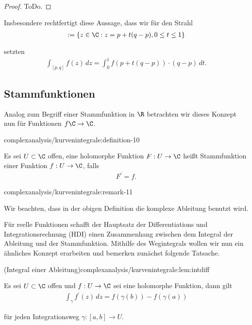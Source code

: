 \documentclass[letterpaper,10pt,german]{jupyterBook}
\begin{document}
\begin{proof}
 ToDo.
\end{proof}

\par
Insbesondere rechtfertigt diese Aussage, dass wir für den Strahl
\begin{align*}
[p,q]:=\{z\in\C: z = p+t(q-p), 0\leq t\leq 1\}
\end{align*}
\par
setzten
\begin{align*}
\int_{[p,q]} f(z)\, dz = \int_0^1 f(p+t(q-p))\cdot (q-p)\, dt.
\end{align*}

\subsection{Stammfunktionen}
\label{\detokenize{complexanalysis/kurvenintegrale:stammfunktionen}}
\par
Analog zum Begriff einer Stammfunktion in \(\R\) betrachten wir dieses Konzept nun für Funktionen \(f\C\to\C\).
\begin{definition}{}{complexanalysis/kurvenintegrale:definition-10}



\par
Es sei \(U\subset\C\) offen, eine holomorphe Funktion \(F:U\to\C\) heißt Stammfunktion einer Funktion \(f:U\to\C\), falls
\begin{align*}
F^\prime = f.
\end{align*}\end{definition}
\begin{remark}{}{complexanalysis/kurvenintegrale:remark-11}



\par
Wir beachten, dass in der obigen Definition die komplexe Ableitung benutzt wird.
\end{remark}

\par
Für reelle Funktionen schafft der Hauptsatz der Differentiations  und Integrationsrechnung (HDI) einen Zusammenhang zwischen dem Integral der Ableitung und der Stammfunktion. Mithilfe des Wegintegrals wollen wir nun ein ähnliches Konzept erarbeiten und bemerken zunächst folgende Tatsache.
\begin{lemma}{(Integral einer Ableitung)}{complexanalysis/kurvenintegrale:lem:intdiff}



\par
Es sei \(U\subset\C\) offen und \(f:U\to\C\) sei eine holomorphe Funktion, dann gilt
\begin{align*}
\int_\gamma f^\prime(z)\, dz= f(\gamma(b)) - f(\gamma(a))
\end{align*}
\par
für jeden Integrationsweg \(\gamma:[a,b]\to U\).
\end{lemma}
\end{document}
